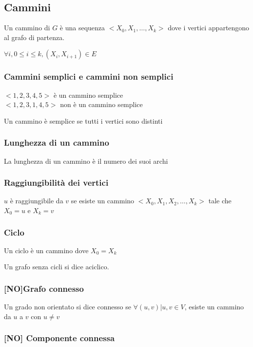 \documentclass[tikz]{article}
\begin{document}
\subsection{Cammini}

{Un cammino di $G$ è una sequenza $<X_0,X_1,\ldots,X_k>$ dove i vertici appartengono al grafo di partenza.}

$\forall i,0\leq i\leq k,(X_i,X_{i+1})\in E$

\subsubsection{Cammini semplici e cammini non semplici}

$<1,2,3,4,5>$ è un cammino semplice\\
$<1,2,3,1,4,5>$ non è un cammino semplice

{Un cammino è semplice se tutti i vertici sono distinti}

\subsubsection{Lunghezza di un cammino}

{La lunghezza di un cammino è il numero dei suoi archi}

\subsubsection{Raggiungibilità dei vertici}

$u$ è raggiungibile da $v$ se esiste un cammino $<X_0,X_1,X_2,\ldots,X_k>$ tale che $X_0 = u$ e $X_k = v$

\subsubsection{Ciclo}

{Un ciclo è un cammino dove $X_0 = X_k$}

{Un grafo senza cicli si dice aciclico.}

\subsubsection{{[}NO{]}Grafo connesso}

{Un grado non orientato si dice connesso se $\forall (u,v) | u,v \in V$, esiste un cammino da $u$ a $v$ con $u\neq v$}

\subsubsection{{[}NO{]} Componente connessa}
\end{document}
